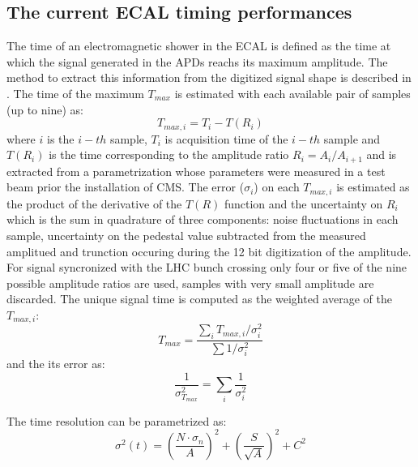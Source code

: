 
\subsection{The current ECAL timing performances}
\label{sec:ecal_time_run1}
The time of an electromagnetic shower in the ECAL is defined as the time at which the signal generated
in the APDs reachs its maximum amplitude. The method to extract this information from the digitized signal
shape is described in \cite{ecal_time_reco}. The time of the maximum $T_{max}$ is estimated with each
available pair of samples (up to nine) as:
\[
T_{max, i} = T_i - T(R_i)
\]
where $i$ is the $i-th$ sample, $T_i$ is acquisition time of the $i-th$ sample and $T(R_i)$ is the time
corresponding to the amplitude ratio $R_i = A_i/A_{i+1}$ and is extracted from a parametrization whose parameters
were measured in a test beam prior the installation of CMS. The error ($\sigma_i$) on each $T_{max, i}$ is estimated as
the product of the derivative of the $T(R)$ function and the uncertainty on $R_i$ which is the sum in quadrature
of three components: noise fluctuations in each sample, uncertainty on the pedestal value subtracted from the measured amplitued
and trunction occuring during the 12 bit digitization of the amplitude.
For signal syncronized with the LHC bunch crossing only four or five of the nine possible amplitude
ratios are used, samples with very small amplitude are discarded. The unique signal time is computed
as the weighted average of the  $T_{max, i}$:
\[
  T_{max} = \frac{\sum_i T_{max, i}/\sigma_i^2}{\sum 1/\sigma_i^2}
\]
and the its error as:
\[
  \frac{1}{\sigma_{T_{max}}^2} = \sum_i\frac{1}{\sigma_i^2}
\]

The time resolution can be parametrized as:
\begin{equation}
  \sigma^2(t) = \left( \frac{N\cdot\sigma_n}{A} \right)^2 + \left( \frac{S}{\sqrt{A}} \right)^2 + C^2  
\end{equation}
\label{eq:general_time_res}

